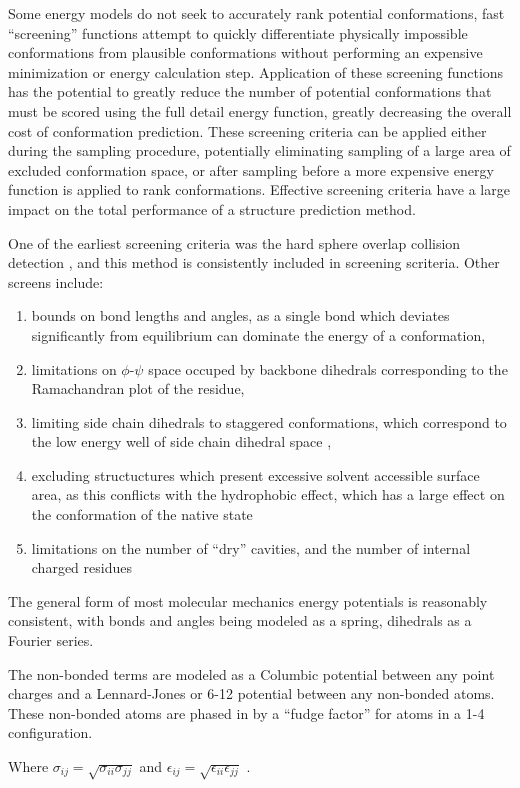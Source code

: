 Some energy models do not seek to accurately rank potential conformations, fast ``screening'' functions attempt to quickly differentiate physically impossible conformations from plausible conformations without performing an expensive minimization or energy calculation step.
Application of these screening functions has the potential to greatly reduce the number of potential conformations that must be scored using the full detail energy function, greatly decreasing the overall cost of conformation prediction.
These screening criteria can be applied either during the sampling procedure, potentially eliminating sampling of a large area of excluded conformation space, or after sampling before a more expensive energy function is applied to rank conformations.
Effective screening criteria have a large impact on the total performance of a structure prediction method.

One of the earliest screening criteria was the hard sphere overlap collision detection \cite{levinthal1966molecular}, and this method is consistently included in screening scriteria.
Other screens include:
\begin{enumerate}
\item bounds on bond lengths and angles, as a single bond which deviates significantly from equilibrium can dominate the energy of a conformation,
\item limitations on $\phi$-$\psi$ space occuped by backbone dihedrals corresponding to the Ramachandran plot of the residue,
\item limiting side chain dihedrals to staggered conformations, which correspond to the low energy well of side chain dihedral space \cite{moult1986algorithm},
\item excluding structuctures which present excessive solvent accessible surface area, as this conflicts with the hydrophobic effect, which has a large effect on the conformation of the native state \cite{chothia1975principles}
\item limitations on the number of ``dry'' cavities, and the number of internal charged residues \cite{moult1986algorithm}
\end{enumerate}

The general form of most molecular mechanics energy potentials is reasonably consistent, with bonds and angles being modeled as a spring, dihedrals as a Fourier series.




The non-bonded terms are modeled as a Columbic potential between any point charges and a Lennard-Jones or 6-12 potential between any non-bonded atoms.
These non-bonded atoms are phased in by a ``fudge factor'' for atoms in a 1-4 configuration.

Where $\sigma_{ij} = \sqrt{\sigma_{ii} \sigma_{jj}}$ and $\epsilon_{ij} = \sqrt{\epsilon_{ii}\epsilon_{jj}}$ \cite{jorgensen1996development}.

